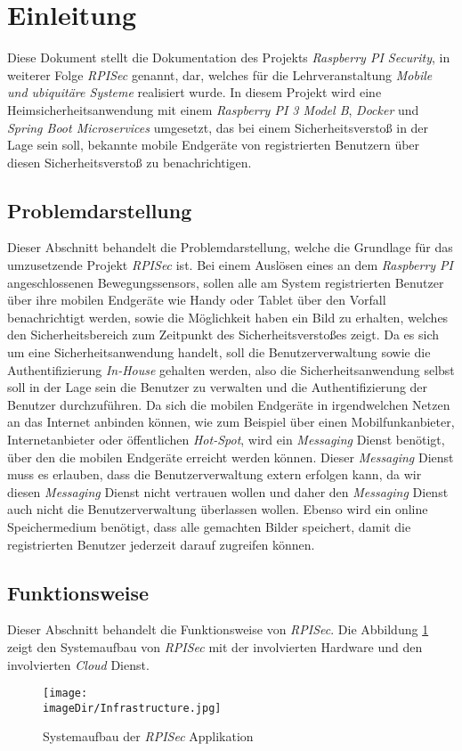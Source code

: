 \section{Einleitung}
Diese Dokument stellt die Dokumentation des Projekts \emph{Raspberry PI Security}, in weiterer Folge \emph{RPISec} genannt, dar, welches für die Lehrveranstaltung \emph{Mobile und ubiquitäre Systeme} realisiert wurde. In diesem Projekt wird eine Heimsicherheitsanwendung mit einem \emph{Raspberry PI 3 Model B}, \emph{Docker} und \emph{Spring Boot Microservices} umgesetzt, das bei einem Sicherheitsverstoß in der Lage sein soll, bekannte mobile Endgeräte von registrierten Benutzern über diesen Sicherheitsverstoß zu benachrichtigen. 

\subsection{Problemdarstellung}
Dieser Abschnitt behandelt die Problemdarstellung, welche die Grundlage für das umzusetzende Projekt \emph{RPISec} ist. Bei einem Auslösen eines an dem \emph{Raspberry PI} angeschlossenen Bewegungssensors, sollen alle am System registrierten Benutzer über ihre mobilen Endgeräte wie Handy oder Tablet über den Vorfall benachrichtigt werden, sowie die Möglichkeit haben ein Bild zu erhalten, welches den Sicherheitsbereich zum Zeitpunkt des Sicherheitsverstoßes zeigt. 
\newline
\newline
Da es sich um eine Sicherheitsanwendung handelt, soll die Benutzerverwaltung sowie die Authentifizierung \emph{In-House} gehalten werden, also die Sicherheitsanwendung selbst soll in der Lage sein die Benutzer zu verwalten und die Authentifizierung der Benutzer durchzuführen. Da sich die mobilen Endgeräte in irgendwelchen Netzen an das Internet anbinden können, wie zum Beispiel über einen Mobilfunkanbieter, Internetanbieter oder öffentlichen \emph{Hot-Spot}, wird ein \emph{Messaging} Dienst benötigt, über den die mobilen Endgeräte erreicht werden können. Dieser \emph{Messaging} Dienst muss es erlauben, dass die Benutzerverwaltung extern erfolgen kann, da wir diesen \emph{Messaging} Dienst nicht vertrauen wollen und daher den \emph{Messaging} Dienst auch nicht die Benutzerverwaltung überlassen wollen. Ebenso wird ein online Speichermedium benötigt, dass alle gemachten Bilder speichert, damit die registrierten Benutzer jederzeit darauf zugreifen können.

\subsection{Funktionsweise}
Dieser Abschnitt behandelt die Funktionsweise von \emph{RPISec}. Die Abbildung \ref{fig:image-system-structure} zeigt den Systemaufbau von \emph{RPISec} mit der involvierten Hardware und den involvierten \emph{Cloud} Dienst. 
\begin{figure}[h]
	\centering
	\texttt{[image: \\imageDir/Infrastructure.jpg]}
	\caption{Systemaufbau der \emph{RPISec} Applikation}
	\label{fig:image-system-structure}
\end{figure}
\ \newpage

